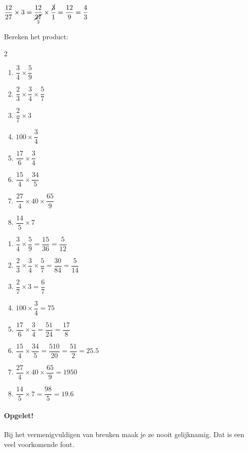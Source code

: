\documentclass{bis}
\begin{document}
\begin{voorbeeld}
$\dfrac{12}{27}\times 3=\dfrac{12}{\underset{3}{\cancel{27}}}\times\dfrac{\cancel{3}}{1}=\dfrac{12}{9}=\dfrac{4}{3}$\\
\end{voorbeeld}

\begin{exercise}
Bereken het product:
\begin{multicols}{2}
  \begin{enumerate}
    \item $\dfrac{3}{4}\times\dfrac{5}{9}$
    \item $\dfrac{2}{3}\times\dfrac{3}{4}\times\dfrac{5}{7}$
    \item $\dfrac{2}{7}\times 3$
    \item $100\times\dfrac{3}{4}$
    \item $\dfrac{17}{6}\times\dfrac{3}{4}$
    \item $\dfrac{15}{4}\times\dfrac{34}{5}$
    \item $\dfrac{27}{4}\times 40\times\dfrac{65}{9}$
    \item $\dfrac{14}{5}\times 7$
  \end{enumerate}
\end{multicols}
\end{exercise}

\begin{solution}
  \begin{enumerate}
    \item $\dfrac{3}{4}\times\dfrac{5}{9}=\dfrac{15}{36}=\dfrac{5}{12}$
    \item $\dfrac{2}{3}\times\dfrac{3}{4}\times\dfrac{5}{7}=\dfrac{30}{84}=\dfrac{5}{14}$
    \item $\dfrac{2}{7}\times 3=\dfrac{6}{7}$
    \item $100\times\dfrac{3}{4}=75$
    \item $\dfrac{17}{6}\times\dfrac{3}{4}=\dfrac{51}{24}=\dfrac{17}{8}$
    \item $\dfrac{15}{4}\times\dfrac{34}{5}=\dfrac{510}{20}=\dfrac{51}{2}=25.5$
    \item $\dfrac{27}{4}\times 40\times\dfrac{65}{9}=1950$
    \item $\dfrac{14}{5}\times 7=\dfrac{98}{5}=19.6$
  \end{enumerate}
\end{solution}

\paragraph*{Opgelet!} Bij het vermenigvuldigen van breuken maak je ze nooit gelijknamig. Dat is een veel voorkomende fout.
\end{document}
